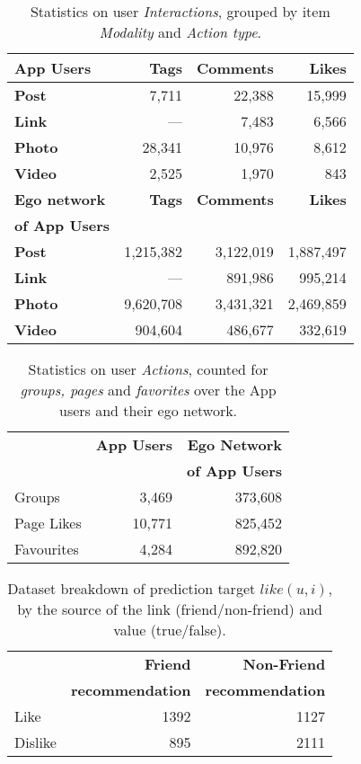 \begin{table}
\centering
\begin{tabular}{|>{\small}l|>{\small}r|>{\small}r|>{\small}r|}
\hline
\textbf{App Users} & \textbf{Tags} & \textbf{Comments} & \textbf{Likes} \\
\hline
\textbf{Post} & 7,711 & 22,388 & 15,999 \\
\hline
\textbf{Link}  & --- & 7,483 & 6,566 \\
\hline
\textbf{Photo} & 28,341 & 10,976 & 8,612 \\
\hline
\textbf{Video} & 2,525 & 1,970 & 843 \\
\hline
\hline
\textbf{Ego network} & \textbf{Tags} & \textbf{Comments} & \textbf{Likes} \\
\textbf{of App Users}  & & & \\
\hline
\textbf{Post} & 1,215,382 & 3,122,019 & 1,887,497 \\
\hline
\textbf{Link} & --- & 891,986 & 995,214 \\
\hline
\textbf{Photo} & 9,620,708 & 3,431,321 & 2,469,859 \\
\hline
\textbf{Video} & 904,604 & 486,677 & 332,619 \\
\hline
\end{tabular}
\caption{Statistics on user {\em Interactions}, grouped by item {\em Modality} and {\em Action type}.}
\label{tab:interactions}
\end{table}


\begin{table}[t!]
\centering
\begin{tabular}{|>{\small}l|>{\small}r|>{\small}r|}
\hline
& \textbf{App Users} & \textbf{Ego Network} \\
& & \textbf{of App Users} \\
\hline
Groups & 3,469 & 373,608 \\
\hline
Page Likes & 10,771 & 825,452 \\
\hline
Favourites & 4,284 & 892,820\\
\hline
\end{tabular}
\caption{Statistics on user {\em Actions}, counted for {\em groups, pages} and {\em favorites} over the App users and their ego network.}
\label{tab:interests}
\end{table}

\begin{table}[t!]
\centering
\begin{tabular}{|>{\small}l|>{\small}r|>{\small}r|}\hline
&\textbf{Friend}  & \textbf{Non-Friend} \\
&\textbf{recommendation}  & \textbf{recommendation} \\
\hline
Like& 1392 & 1127 \\
\hline
Dislike& 895 & 2111\\
\hline
\end{tabular}
\caption{Dataset breakdown of prediction target $like(u,i)$, by the source of the link (friend/non-friend) and value (true/false).}
\label{tab:likeinfo}
\end{table}


